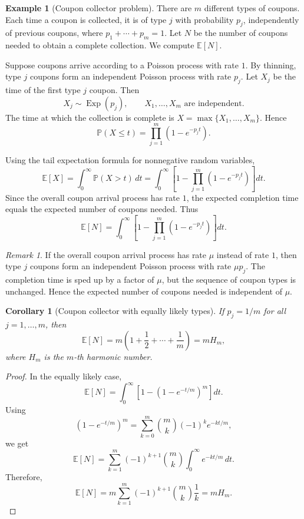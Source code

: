 \documentclass[11pt]{article}
\theoremstyle{plain}
\newtheorem{corollary}[theorem]{Corollary}
\theoremstyle{definition}
\newtheorem{example}[theorem]{Example}
\theoremstyle{remark}
\newtheorem{remark}[theorem]{Remark}
\begin{document}
	\begin{example}[Coupon collector problem]
		There are \(m\) different types of coupons. Each time a coupon is collected, it is of type \(j\) with probability \(p_j\), independently of previous coupons, where \(p_1+\cdots+p_m=1\). Let \(N\) be the number of coupons needed to obtain a complete collection. We compute \(\mathbb{E}[N]\).
		
		Suppose coupons arrive according to a Poisson process with rate \(1\). By thinning, type \(j\) coupons form an independent Poisson process with rate \(p_j\). Let \(X_j\) be the time of the first type \(j\) coupon. Then
		\[
		X_j\sim\operatorname{Exp}(p_j),
		\qquad
		X_1,\dots,X_m \text{ are independent}.
		\]
		The time at which the collection is complete is \(X=\max\{X_1,\dots,X_m\}\). Hence
		\[
		\mathbb{P}(X\le t)
		=
		\prod_{j=1}^{m}(1-e^{-p_jt}).
		\]
		
		Using the tail expectation formula for nonnegative random variables,
		\[
		\mathbb{E}[X]
		=
		\int_0^\infty \mathbb{P}(X>t)\,dt
		=
		\int_0^\infty
		\left[
		1-\prod_{j=1}^{m}(1-e^{-p_jt})
		\right]dt.
		\]
		Since the overall coupon arrival process has rate \(1\), the expected completion time equals the expected number of coupons needed. Thus
		\[
		\mathbb{E}[N]
		=
		\int_0^\infty
		\left[
		1-\prod_{j=1}^{m}(1-e^{-p_jt})
		\right]dt.
		\]
	\end{example}
	
	\begin{remark}
		If the overall coupon arrival process has rate \(\mu\) instead of rate \(1\), then type \(j\) coupons form an independent Poisson process with rate \(\mu p_j\). The completion time is sped up by a factor of \(\mu\), but the sequence of coupon types is unchanged. Hence the expected number of coupons needed is independent of \(\mu\).
	\end{remark}
	
	\begin{corollary}[Coupon collector with equally likely types]
		If \(p_j=1/m\) for all \(j=1,\dots,m\), then
		\[
		\mathbb{E}[N]
		=
		m\left(1+\frac12+\cdots+\frac1m\right)
		=
		mH_m,
		\]
		where \(H_m\) is the \(m\)-th harmonic number.
	\end{corollary}
	
	\begin{proof}
		In the equally likely case,
		\[
		\mathbb{E}[N]
		=
		\int_0^\infty \left[1-(1-e^{-t/m})^m\right]dt.
		\]
		Using
		\[
		(1-e^{-t/m})^m
		=
		\sum_{k=0}^{m}\binom{m}{k}(-1)^k e^{-kt/m},
		\]
		we get
		\[
		\mathbb{E}[N]
		=
		\sum_{k=1}^{m}(-1)^{k+1}\binom{m}{k}\int_0^\infty e^{-kt/m}\,dt.
		\]
		Therefore,
		\[
		\mathbb{E}[N]
		=
		m\sum_{k=1}^{m}(-1)^{k+1}\binom{m}{k}\frac1k
		=
		mH_m.
		\]
	\end{proof}
	
\end{document}
